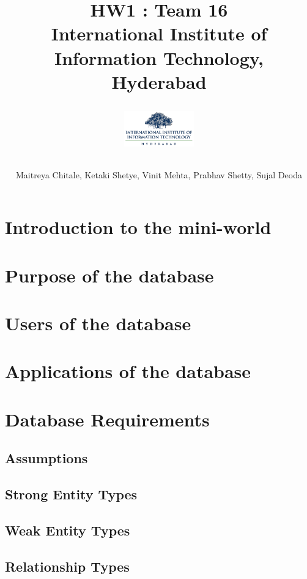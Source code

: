 \documentclass{article}
\begin{document}
\title{
    {HW1 : Team 16}\\
    {\large International Institute of Information Technology, Hyderabad}\\
    \author{Maitreya Chitale, Ketaki Shetye, Vinit Mehta, Prabhav Shetty, Sujal Deoda}
    \vspace{1cm}
    \includegraphics[width=3cm]{IIITH.png}
}
\date{}

\maketitle

\section{Introduction to the mini-world}

\section{Purpose of the database}

\section{Users of the database}

\section{Applications of the database}

\section{Database Requirements}
    \subsection{Assumptions}
    \subsection{Strong Entity Types}
    \subsection{Weak Entity Types}
    \subsection{Relationship Types}
\end{document}
